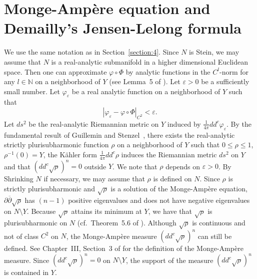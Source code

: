 \documentclass[12pt,oneside]{amsart}
\theoremstyle{plain}
\theoremstyle{definition}
\theoremstyle{remark}
\begin{document}
\section{Monge-Amp\`ere equation and Demailly's Jensen-Lelong formula}\label{section:5}
We use the same notation as in Section~\ref{section:4}.  
Since $N$ is Stein, we may assume that $N$ is a real-analytic submanifold in a higher dimensional Euclidean space.  
Then one can approximate $\varphi \circ \Phi$ by analytic functions in the $C^l$-norm for any $l \in \mathbb{N}$ on a neighborhood of $Y$ (see Lemma~5 of \cite{Whi}).  
Let $\varepsilon > 0$ be a sufficiently small number.  
Let $\varphi_{\varepsilon}$ be a real analytic function on a neighborhood of $Y$ such that 
\begin{equation}\label{equation:7}
|\varphi_{\varepsilon}-\varphi\circ\Phi|_{C^2} < \varepsilon. 
\end{equation} 
Let $ds^2$ be the real-analytic Riemannian metric on $Y$ induced by $\frac{1}{4\pi}dd^c \varphi_{\varepsilon}$.  
By the fundamental result of Guillemin and Stenzel~\cite{Gui-Ste}, 
there exists the real-analytic strictly plurisubharmonic function $\rho$ on a neighborhood of $Y$ such that $0 \leq \rho \leq 1$, $\rho^{-1}(0) = Y$, the K\"ahler form $\frac{1}{4\pi}dd^c \rho$ induces the Riemannian metric $ds^2$ on $Y$ and that 
$
(dd^c \sqrt{\rho})^n = 0
$
outside $Y$.  
We note that $\rho$ depends on $\varepsilon > 0$.  
By Shrinking $N$ if necessary, we may assume that $\rho$ is defined on $N$.  
Since $\rho$ is strictly plurisubharmonic and $\sqrt{\rho}$ is a solution of the Monge-Amp\`ere equation, $\partial \overline{\partial}\sqrt{\rho}$ has $(n-1)$ positive eigenvalues and does not have negative eigenvalues on $N \setminus Y$.  
Because $\sqrt{\rho}$ attains its minimum at $Y$, 
we have that $\sqrt{\rho}$ is plurisubharmonic on $N$ (cf.~Theorem~5.6 of \cite{Lem-Szo}).  
Although $\sqrt{\rho}$ is continuous and not of class $C^2$ on $N$, the Monge-Amp\`ere measure $(dd^c \sqrt{\rho})^n$ can still be defined.  
See Chapter~III, Section~3 of \cite{Dem} for the definition of the Monge-Amp\`ere measure.  
Since $(dd^c \sqrt{\rho})^n = 0$ on $N \setminus Y$, the support of the measure $(dd^c \sqrt{\rho})^n$ is contained in $Y$.  
\end{document}
